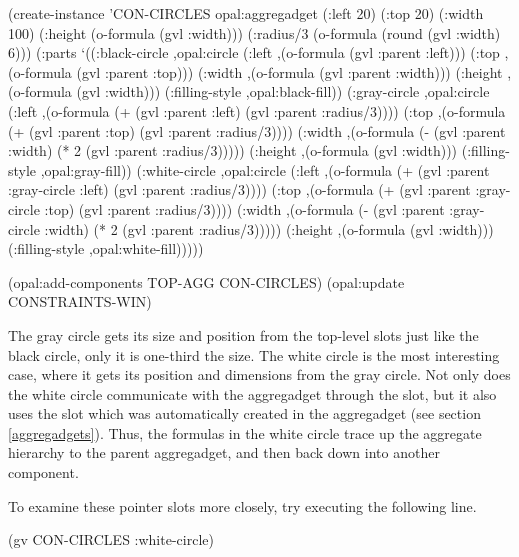 \begin{programexample}
(create-instance 'CON-CIRCLES opal:aggregadget
   (:left 20) (:top 20)
   (:width 100)
   (:height (o-formula (gvl :width)))
   (:radius/3 (o-formula (round (gvl :width) 6)))
   (:parts
    `((:black-circle ,opal:circle
                     (:left ,(o-formula (gvl :parent :left)))
                     (:top ,(o-formula (gvl :parent :top)))
                     (:width ,(o-formula (gvl :parent :width)))
                     (:height ,(o-formula (gvl :width)))
                     (:filling-style ,opal:black-fill))
      (:gray-circle ,opal:circle
                    (:left ,(o-formula (+ (gvl :parent :left)
					  (gvl :parent :radius/3))))
                    (:top ,(o-formula (+ (gvl :parent :top)
					 (gvl :parent :radius/3))))
                    (:width ,(o-formula (- (gvl :parent :width)
					   (* 2 (gvl :parent :radius/3)))))
                    (:height ,(o-formula (gvl :width)))
                    (:filling-style ,opal:gray-fill))
      (:white-circle ,opal:circle
                     (:left ,(o-formula (+ (gvl :parent :gray-circle :left)
					   (gvl :parent :radius/3))))
                     (:top ,(o-formula (+ (gvl :parent :gray-circle :top)
					  (gvl :parent :radius/3))))
                     (:width ,(o-formula (- (gvl :parent :gray-circle :width)
					    (* 2 (gvl :parent :radius/3)))))
                     (:height ,(o-formula (gvl :width)))
                     (:filling-style ,opal:white-fill)))))

(opal:add-components TOP-AGG CON-CIRCLES)
(opal:update CONSTRAINTS-WIN)
\end{programexample}

The gray circle gets its size and position from the top-level slots
just like the black circle, only it is one-third the size.  The white circle
is the most interesting case, where it gets its position and
dimensions from the gray circle.  Not only does the white circle
communicate with the aggregadget through the  slot, but it
also uses the slot  which was automatically created
in the aggregadget (see section \ref{aggregadgets}).  Thus, the
formulas in the white circle trace up the aggregate hierarchy to the
parent aggregadget, and then back down into another component.

To examine these pointer slots more closely, try executing the
following line.

\begin{programexample}
(gv CON-CIRCLES :white-circle)
\end{programexample}

